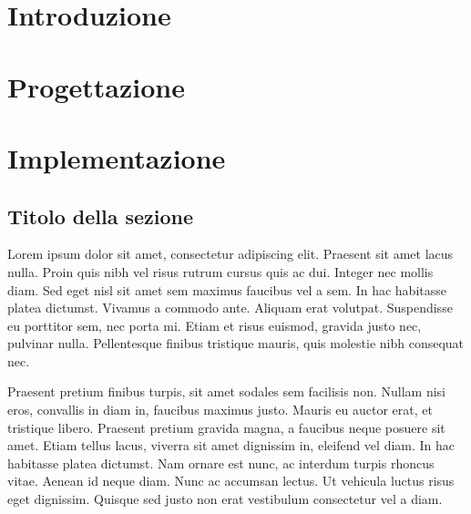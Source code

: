 \documentclass[12pt,a4paper,openright,twoside]{report}
\begin{document}
\clearpage{\pagestyle{empty}\cleardoublepage}
\tableofcontents
{}
\listoffigures
\clearpage{\pagestyle{empty}\cleardoublepage}
\listoftables
\clearpage{\pagestyle{empty}\cleardoublepage}

\clearpage{\pagestyle{empty}\cleardoublepage}

\chapter{Introduzione}
\lhead[\fancyplain{}{\bfseries\thepage}]{\fancyplain{}{\bfseries\rightmark}}


\chapter{Progettazione}
\lhead[\fancyplain{}{\bfseries\thepage}]{\fancyplain{}{\bfseries\rightmark}}


\chapter{Implementazione}
\lhead[\fancyplain{}{\bfseries\thepage}]{\fancyplain{}{\bfseries\rightmark}}



\section{Titolo della sezione}
\label{chap:physical_memory}
Lorem ipsum dolor sit amet, consectetur adipiscing elit. Praesent sit amet lacus nulla. Proin quis nibh vel risus rutrum cursus quis ac dui. Integer nec mollis diam. Sed eget nisl sit amet sem maximus faucibus vel a sem. In hac habitasse platea dictumst. Vivamus a commodo ante. Aliquam erat volutpat. Suspendisse eu porttitor sem, nec porta mi. Etiam et risus euismod, gravida justo nec, pulvinar nulla. Pellentesque finibus tristique mauris, quis molestie nibh consequat nec.

Praesent pretium finibus turpis, sit amet sodales sem facilisis non. Nullam nisi eros, convallis in diam in, faucibus maximus justo. Mauris eu auctor erat, et tristique libero. Praesent pretium gravida magna, a faucibus neque posuere sit amet. Etiam tellus lacus, viverra sit amet dignissim in, eleifend vel diam. In hac habitasse platea dictumst. Nam ornare est nunc, ac interdum turpis rhoncus vitae. Aenean id neque diam. Nunc ac accumsan lectus. Ut vehicula luctus risus eget dignissim. Quisque sed justo non erat vestibulum consectetur vel a diam.
\end{document}
